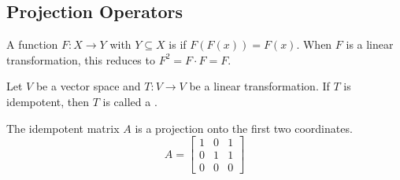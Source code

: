 

\subsection{Projection Operators}

\begin{definition}
A function $F \colon X \rightarrow Y$ with $Y \subseteq X$ is  if $F(F(x))=F(x)$.  When $F$ is a linear transformation, this reduces to $F^2 = F \cdot F = F$.
\end{definition}

\begin{definition}
Let $V$ be a vector space and $T \colon V \rightarrow V$ be a linear transformation.
If $T$ is idempotent, then $T$ is called a .
\end{definition}

\begin{example}
The idempotent matrix $A$ is a projection onto the first two coordinates.
\begin{equation*}
A = \begin{bmatrix}
1 & 0 & 1 \\
0 & 1 & 1 \\
0 & 0 & 0
\end{bmatrix}
\end{equation*}
\end{example}

